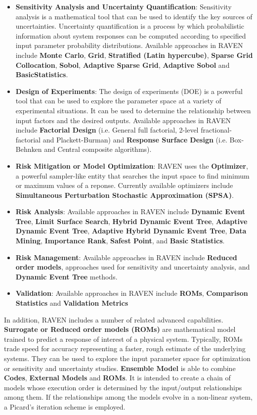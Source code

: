 \begin{itemize}
  \item \textbf{Sensitivity Analysis and Uncertainty Quantification}: Sensitivity analysis is a mathematical tool
    that can be used to identify the key sources of uncertainties. Uncertainty quantification is a process by which
    probabilistic information about system responses can be computed according to specified input parameter probability
    distributions. Available approaches in RAVEN include \textbf{Monte Carlo}, \textbf{Grid}, \textbf{Stratified (Latin hypercube)},
    \textbf{Sparse Grid Collocation}, \textbf{Sobol}, \textbf{Adaptive Sparse Grid}, \textbf{Adaptive Sobol} and
    \textbf{BasicStatistics}.
  \item \textbf{Design of Experiments}: The design of experiments (DOE) is a powerful tool that can be used to explore the
    parameter space at a variety of experimental situations. It can be used to determine the relationship between
    input factors and the desired outputs. Available approaches in RAVEN include \textbf{Factorial Design}
    (i.e. General full factorial, 2-level fractional-factorial and Plackett-Burman) and \textbf{Response Surface Design}
    (i.e. Box-Behnken and Central composite algorithms).
  \item \textbf{Risk Mitigation or Model Optimization}: RAVEN uses the \textbf{Optimizer}, a powerful sampler-like entity that searches
    the input space to find minimum or maximum values of a reponse. Currently available optimizers include
    \textbf{Simultaneous Perturbation Stochastic Approximation (SPSA)}.
  \item \textbf{Risk Analysis}: Available approaches in RAVEN include \textbf{Dynamic Event Tree}, \textbf{Limit Surface Search},
    \textbf{Hybrid Dynamic Event Tree}, \textbf{Adaptive Dynamic Event Tree}, \textbf{Adaptive Hybrid Dynamic Event Tree},
    \textbf{Data Mining}, \textbf{Importance Rank}, \textbf{Safest Point}, and \textbf{Basic Statistics}.
  \item \textbf{Risk Management}: Available approaches in RAVEN include \textbf{Reduced order models},
    approaches used for sensitivity and uncertainty analysis, and \textbf{Dynamic Event Tree} methods.
  \item \textbf{Validation}: Available approaches in RAVEN include \textbf{ROMs}, \textbf{Comparison Statistics} and \textbf{Validation Metrics} 
\end{itemize}

In addition, RAVEN includes a number of related advanced capabilities. \textbf{Surrogate or Reduced order models (ROMs)} are mathematical
model trained to predict a response of interest of a physical system. Typically, ROMs trade speed for accuracy representing
a faster, rough estimate of the underlying systems. They can be used to explore the input parameter space for optimization
or sensitivity and uncertainty studies. \textbf{Ensemble Model} is able to combine \textbf{Codes}, \textbf{External Models}
and \textbf{ROMs}. It is intended to create a chain of models whose execution order is determined by the input/output
relationships among them. If the relationships among the models evolve in a non-linear system, a Picard's iteration scheme is
employed.

